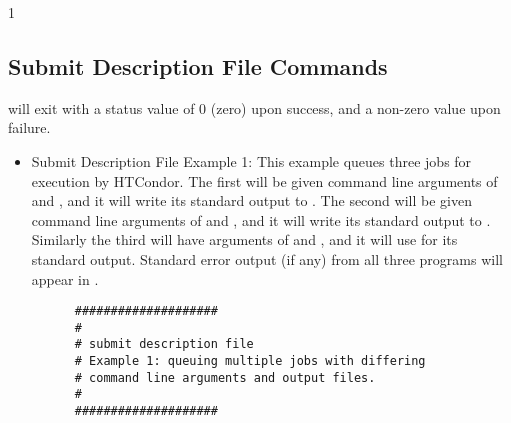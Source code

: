 \begin{ManPage}{\label{man-condor-submit}}{1}
\begin{Options}

\end{Options}

\subsection*{Submit Description File Commands}


\ExitStatus

 will exit with a status value of 0 (zero) upon success, and a
non-zero value upon failure.

\label{condor-submit-examples}
\Examples

\begin{itemize} 
\item{Submit Description File Example 1:} This example queues three jobs for
execution by HTCondor. The first will be given command line arguments of
 and , and it will write its standard output
to .
The second will be given command line arguments of 
 and , and it will
write its standard output to .
Similarly the third will have
arguments of 
 and , and it will use  for its standard
output. Standard error output (if any) from all three programs will
appear in .

\footnotesize
\begin{verbatim}
      ####################
      #
      # submit description file
      # Example 1: queuing multiple jobs with differing
      # command line arguments and output files.
      #                                                                      
      ####################                                                   
                                                                         

\end{verbatim}
\end{itemize}
\end{ManPage}
